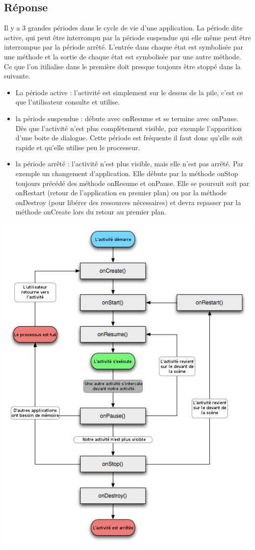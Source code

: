 \documentclass[francais,12pt]{article}
\begin{document}
		\subsection*{Réponse}
		Il y a 3 grandes périodes dans le cycle de vie d'une application. La période dite active, qui peut être interrompu par la période
		suspendue qui elle même peut être interrompue par la période arrêté.
		L'entrée dans chaque état est symbolisée par une méthode et la sortie de chaque état est symbolisée par une autre méthode. Ce que l'on itilialise dans le première doit presque toujours être stoppé dans la suivante.
		
		\begin{itemize}
			\item La période active : l'activité est simplement sur le dessus de la pile, c'est ce que l'utilisateur consulte et utilise. 
			\item la période suspendue : débute avec onResume et se termine avec onPause. Dès que l'activité n'est plus complètement visible, par exemple l'apparition d'une boite de dialogue. Cette période est fréquente il faut donc qu'elle soit rapide et qu'elle utilise peu le processeur.
			\item la période arrêté : l'activité n'est plus visible, mais elle n'est pas arrêté. Par exemple un changement d'application. Elle débute par la méthode onStop toujours précédé des méthode onResume et onPause. Elle se poursuit soit par onRestart (retour de l'application en premier plan) ou par la méthode onDestroy (pour libérer des ressources nécessaires) et devra repasser par la méthode onCreate lors du retour au premier plan.
		\end{itemize}
		
		\begin{center}
			\includegraphics[width=0.85\linewidth]{images/cycleVie}
		\end{center}
	\newpage
		
\end{document}

